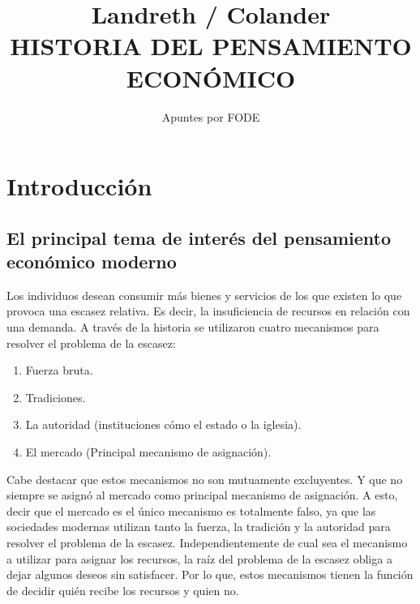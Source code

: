\documentclass[10pt]{book}
\begin{document}
\normalfont

\author{\Large Apuntes por FODE}
\title{\small Landreth / Colander \\ \vspace{1cm} \large HISTORIA DEL PENSAMIENTO ECONÓMICO}
\date{}
\pagestyle{empty}
\maketitle
\thispagestyle{empty}
\let\cleardoublepage\clearpage
\tableofcontents								%


 
\let\cleardoublepage\clearpage

\chapter{Introducción}
\section{El principal tema de interés del pensamiento económico moderno}
Los individuos desean consumir más bienes y servicios de los que existen lo que provoca una escasez relativa. Es decir, la insuficiencia de recursos en relación con una demanda. A través de la historia se utilizaron cuatro mecanismos para resolver el problema de la escasez:

\begin{enumerate}[1.]
    \item Fuerza bruta.
    \item Tradiciones.
    \item La autoridad (instituciones cómo el estado o la iglesia).
    \item El mercado (Principal mecanismo de asignación).
\end{enumerate}

Cabe destacar que estos mecanismos no son mutuamente excluyentes. Y que no siempre se asignó al mercado como principal mecanismo de asignación. A esto, decir que el mercado es el único mecanismo es totalmente falso, ya que las sociedades modernas utilizan tanto la fuerza, la tradición y la autoridad para resolver el problema de la escasez. Independientemente de cual sea el mecanismo a utilizar para asignar los recursos, la raíz del problema de la escasez obliga a dejar algunos deseos sin satisfacer. Por lo que, estos  mecanismos tienen la función de decidir quién recibe los recursos y quien no.
\end{document}
